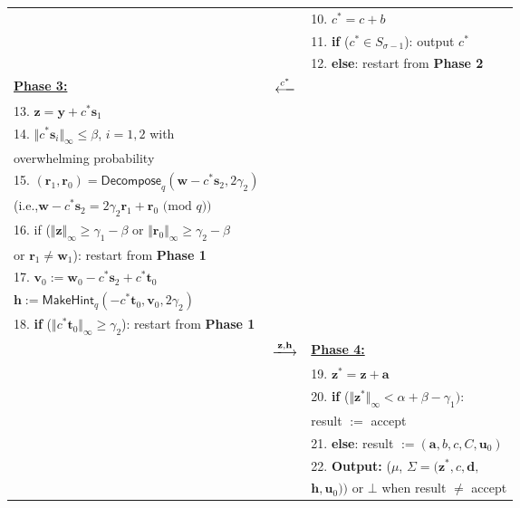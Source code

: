 \documentclass[conference]{IEEEtran}
\begin{document}
\begin{figure*}[pt]
\begin{tabular}{|  l c l | }
			&&10. $c^*=c+b$\\
			&&11. \textbf{if} ($c^* \in S_{\sigma-1}$):  output $c^*$ \\
			&&12. \textbf{else}: restart from \textbf{Phase 2}\\
			\hline
			\textbf{\underline{Phase 3:}}&$\xlongleftarrow{c^*}$&\\
			
			13. $\mathbf{z}=\mathbf{y}+c^*\mathbf{s}_1$&&\\
			14. $\Vert c^*\mathbf{s}_i \Vert_\infty \leq \beta$, $i=1,2$ with &&\\
			\hspace{0.5cm} overwhelming probability&&\\
			15. $(\mathbf{r}_1,\mathbf{r}_0)=\textsf{Decompose}_q(\mathbf{w}-c^*\mathbf{s}_2, 2\gamma_2)$&&\\
			\hspace{0.5cm}	(i.e.,$ \mathbf{w}-c^*\mathbf{s}_2=2\gamma_2\mathbf{r}_1+\mathbf{r}_0 \text{ (mod } q))$&&\\
			
			
			16.  if ($\Vert\mathbf{z} \Vert_{\infty} \geq \gamma_1-\beta$ or $\Vert\mathbf{r}_0 \Vert_{\infty} \geq \gamma_2-\beta$&&  \\
			\hspace{0.5cm} or $\mathbf{r}_1\neq \mathbf{w}_1 $):  restart from \textbf{Phase 1}&&  \\
			17.	 $\mathbf{v}_0:=\mathbf{w}_0-c^*\mathbf{s}_2+c^*\mathbf{t}_0$&&  \\	 
			\hspace{0.4cm} $\mathbf{h}:=\textsf{MakeHint}_q(-c^*\mathbf{t}_0,\mathbf{v}_0, 2\gamma_2)$&&  \\	
			18.	 \textbf{if} ($\Vert c^*\mathbf{t}_0 \Vert_{\infty} \geq  \gamma_2$): restart from \textbf{Phase 1}&&  \\
			\hline
			&$\xlongrightarrow{\mathbf{z}, \mathbf{h}} $&\textbf{\underline{Phase 4:}}\\
			&& 19. $\mathbf{z}^*=\mathbf{z}+\mathbf{a}$\\
			&&20. \textbf{if} ($\Vert\mathbf{z}^* \Vert_{\infty} < \alpha+\beta-\gamma_1):$  \\
			&&\hspace{1cm}  \textsf{result} $:= $ \textsf{accept}\\
			
			&& 21. \textbf{else}:  \textsf{result} $:= (\mathbf{a}, b, c, C, \mathbf{u}_0)$\\
			&&22. \textbf{Output:} ($\mu$, $ \Sigma=(\mathbf{z}^*, c, \mathbf{d},$\\
			&&\hspace{0.5cm}  $ \mathbf{h}, \mathbf{u}_0))$ or $\bot$ when \textsf{result }$\neq$ \textsf{accept}\\
			

\end{tabular}
\end{figure*}
\end{document}
